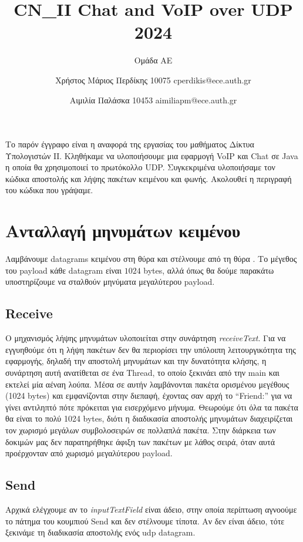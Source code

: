 \documentclass{article}
\title{CN\_II Chat and VoIP over UDP 2024}
\author{\phantom{hehehe they will never see this coming!}Ομάδα ΑΕ\phantom{hehehe they will never see this coming!} \and 
    Χρήστος Μάριος Περδίκης 10075 cperdikis@ece.auth.gr
   \and Αιμιλία Παλάσκα 10453 aimiliapm@ece.auth.gr}
\date{}
\begin{document}
\maketitle

Το παρόν έγγραφο είναι η αναφορά της εργασίας του μαθήματος Δίκτυα Υπολογιστών 
ΙΙ. Κληθήκαμε να υλοποιήσουμε μια εφαρμογή VoIP και Chat σε Java η οποία θα
χρησιμοποιεί το πρωτόκολλο UDP. Συγκεκριμένα υλοποιήσαμε τον κώδικα αποστολής 
και λήψης πακέτων κειμένου και φωνής. Ακολουθεί η περιγραφή του κώδικα που γράψαμε.

\section{Ανταλλαγή μηνυμάτων κειμένου}
Λαμβάνουμε datagrams κειμένου στη θύρα \textdestport{} και στέλνουμε από τη θύρα 
\textdestport. Το μέγεθος του payload κάθε datagram είναι $1024$ bytes, αλλά όπως θα 
δούμε παρακάτω υποστηρίζουμε να σταλθούν μηνύματα μεγαλύτερου payload.

\subsection{Receive}
Ο μηχανισμός λήψης μηνυμάτων υλοποιείται στην συνάρτηση \textit{receiveText}.
Για να εγγυηθούμε ότι η λήψη πακέτων δεν θα περιορίσει την υπόλοιπη λειτουργικότητα της
εφαρμογής, δηλαδή την αποστολή μηνυμάτων και την δυνατότητα κλήσης, η συνάρτηση αυτή
ανατίθεται σε ένα Thread, το οποίο ξεκινάει από την main και εκτελεί μία αέναη λούπα. 
Μέσα σε αυτήν λαμβάνονται πακέτα ορισμένου μεγέθους (1024 bytes) και εμφανίζονται στην
διεπαφή, έχοντας σαν αρχή το ``Friend:'' για να γίνει αντιληπτό πότε πρόκειται για εισερχόμενο
μήνυμα. Θεωρούμε ότι όλα τα πακέτα θα είναι το πολύ 1024 bytes, διότι η διαδικασία
αποστολής μηνυμάτων διαχειρίζεται τον χωρισμό μεγάλων συμβολοσειρών σε πολλαπλά πακέτα.
Στην διάρκεια των δοκιμών μας δεν παρατηρήθηκε άφιξη των πακέτων με λάθος σειρά, όταν αυτά
προέρχονταν από χωρισμό μεγαλύτερου payload. 

\subsection{Send}
Αρχικά ελέγχουμε αν το \textit{inputTextField} είναι άδειο, στην οποία 
περίπτωση αγνοούμε το πάτημα του κουμπιού Send και δεν στέλνουμε τίποτα. 
Αν δεν είναι άδειο, τότε ξεκινάμε τη διαδικασία αποστολής ενός udp datagram.
\end{document}

